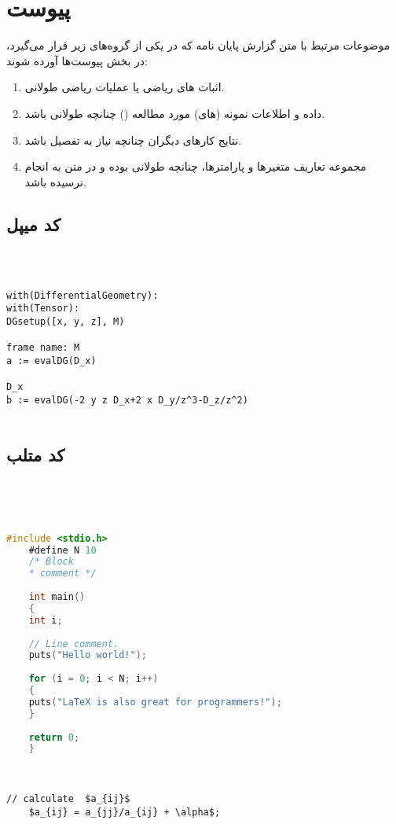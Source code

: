 \chapter*{‌پیوست}
موضوعات مرتبط با متن گزارش پایان نامه كه در يكی از گروه‌های زير قرار می‌گيرد، در بخش پيوست‌ها آورده شوند:
\begin{enumerate}
\item  اثبات های رياضی يا عمليات رياضی طولانی‌.‌
\item داده و اطلاعات نمونه (های) مورد مطالعه () چنانچه طولانی باشد‌.‌
\item نتايج كارهای ديگران چنانچه نياز به تفصيل باشد‌.‌
\item مجموعه تعاريف متغيرها و پارامترها، چنانچه طولانی بوده و در متن به انجام نرسيده باشد‌.‌
\end{enumerate}
\section*{کد میپل }
‌\\
\begin{latin}
\begin{verbatim}

with(DifferentialGeometry):
with(Tensor):
DGsetup([x, y, z], M)
																	frame name: M
a := evalDG(D_x)
																	D_x
b := evalDG(-2 y z D_x+2 x D_y/z^3-D_z/z^2)


\end{verbatim}
\end{latin}
\section*{کد متلب }
‌\\
\begin{latin}
	
\end{latin}
‌\\
\begin{latin}
	\begin{lstlisting}[language=C]
	#include <stdio.h>
	#define N 10
	/* Block
	* comment */
	
	int main()
	{
	int i;
	
	// Line comment.
	puts("Hello world!");
	
	for (i = 0; i < N; i++)
	{
	puts("LaTeX is also great for programmers!");
	}
	
	return 0;
	}
	\end{lstlisting}
\end{latin}
‌\\
\begin{latin}
	\begin{lstlisting}[mathescape=true]
	// calculate  $a_{ij}$
	$a_{ij} = a_{jj}/a_{ij} + \alpha$;
	\end{lstlisting}
\end{latin}